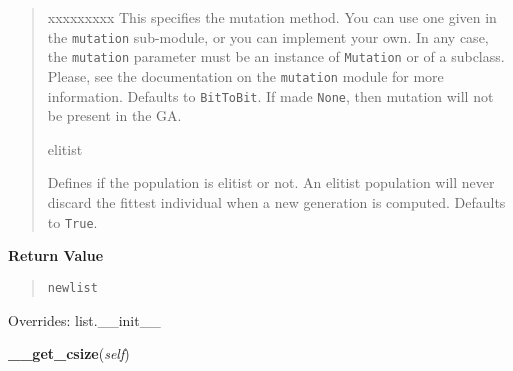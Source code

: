 \begin{boxedminipage}{\textwidth}
\begin{quote}
\begin{Ventry}{xxxxxxxxx}
This specifies the mutation method. You can use one given in the
\texttt{mutation} sub-module, or you can implement your own. In any
case, the \texttt{mutation} parameter must be an instance of \texttt{Mutation}
or of a subclass. Please, see the documentation on the \texttt{mutation}
module for more information. Defaults to \texttt{BitToBit}.  If made
\texttt{None}, then mutation will not be present in the GA.
          \item[elitist]


Defines if the population is elitist or not. An elitist population
will never discard the fittest individual when a new generation is
computed. Defaults to \texttt{True}.
        \end{Ventry}

      \end{quote}

    \vspace{1ex}

      \textbf{Return Value}
      \begin{quote}
\begin{alltt}
new list
\end{alltt}

      \end{quote}

    \vspace{1ex}

      Overrides: list.\_\_init\_\_

    \end{boxedminipage}

    \label{peach:ga:ga:GA:__get_csize}

    \vspace{0.5ex}

    \begin{boxedminipage}{\textwidth}

    \raggedright \textbf{\_\_get\_csize}(\textit{self})

    \end{boxedminipage}

    \label{peach:ga:ga:GA:sanity}

    \vspace{0.5ex}

